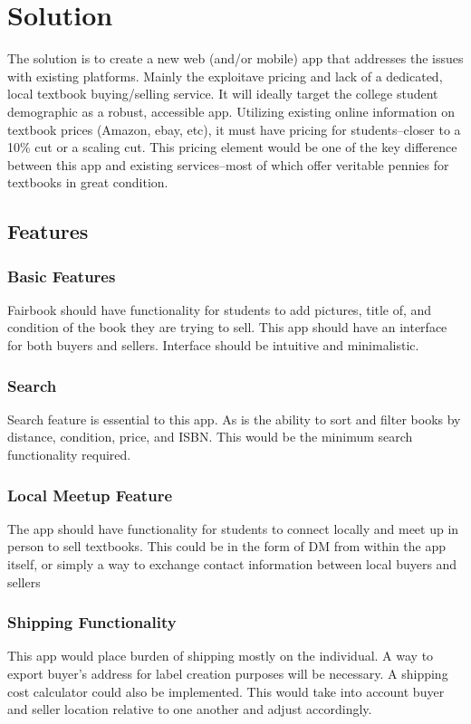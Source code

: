 \documentclass[12pt]{article}
\begin{document}
	\section{Solution}

	The solution is to create a new web (and/or mobile) app that addresses the issues with existing platforms. Mainly the
	exploitave pricing and lack of a dedicated, local textbook buying/selling service.
	It will ideally target the college student demographic as a robust, accessible app. Utilizing existing online
        information on textbook prices (Amazon, ebay, etc), it must have  pricing for students--closer to a 10\% cut or a scaling cut. 
	This pricing element would be one of the key difference between this app and existing services--most of which offer veritable pennies for
	textbooks in great condition.
	\subsection{Features}
		\subsubsection{Basic Features}
		Fairbook should have functionality for students to add pictures, title of, and condition of the book they are trying to sell.
		This app should have an interface for both buyers and sellers. Interface should be intuitive and minimalistic.
		\subsubsection{Search}
        	Search feature is essential to this app. As is the ability to sort and filter books by distance, condition, price, and ISBN. This would be the minimum
		search functionality required.
		\subsubsection{Local Meetup Feature}
		The app should have functionality for students to connect locally and meet up in person to sell textbooks.
		This could be in the form of DM from within the app itself, or simply a way to exchange contact information between local buyers and sellers	
		\subsubsection{Shipping Functionality}
		This app would place burden of shipping mostly on the individual. A way to export buyer's address for label creation
		purposes will be necessary. A shipping cost calculator could also be implemented. This would take into account buyer and seller location
		relative to one another and adjust accordingly. 
\end{document}
